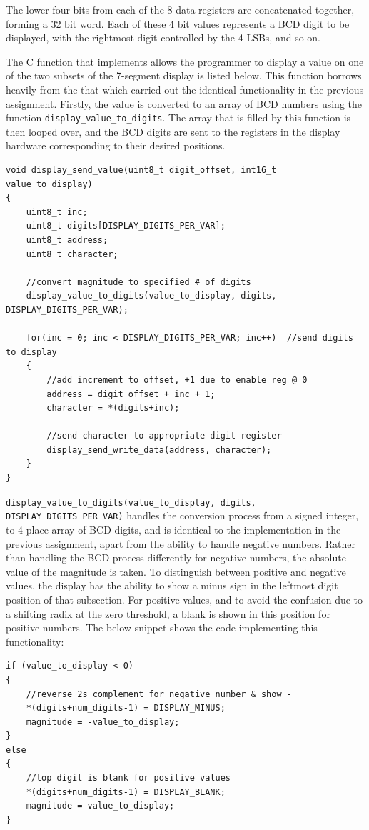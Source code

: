 \documentclass[11pt,british]{report}
\begin{document}
The lower four bits from each of the 8 data registers are concatenated together, forming a 32 bit word. Each of these 4 bit values represents a BCD digit to be displayed, with the rightmost digit controlled by the 4 LSBs, and so on.

The C function that implements allows the programmer to display a value on one of the two subsets of the 7-segment display is listed below. This function borrows heavily from the that which carried out the identical functionality in the previous assignment. Firstly, the value is converted to an array of BCD numbers using the function \lstinline[style={c-style}]|display_value_to_digits|. The array that is filled by this function is then looped over, and the BCD digits are sent to the registers in the display hardware corresponding to their desired positions.
\begin{lstlisting}[style={c-style}]
void display_send_value(uint8_t digit_offset, int16_t value_to_display)
{
	uint8_t inc;
	uint8_t digits[DISPLAY_DIGITS_PER_VAR];
	uint8_t address;
	uint8_t character;
	
	//convert magnitude to specified # of digits
	display_value_to_digits(value_to_display, digits, DISPLAY_DIGITS_PER_VAR); 
	
	for(inc = 0; inc < DISPLAY_DIGITS_PER_VAR; inc++)  //send digits to display
	{   
	    //add increment to offset, +1 due to enable reg @ 0    
		address = digit_offset + inc + 1;
		character = *(digits+inc);
		
		//send character to appropriate digit register
		display_send_write_data(address, character);
	}
}
\end{lstlisting}

\lstinline[style={c-style}]|display_value_to_digits(value_to_display, digits, DISPLAY_DIGITS_PER_VAR)| handles the conversion process from a signed integer, to 4 place array of BCD digits, and is identical to the implementation in the previous assignment, apart from the ability to handle negative numbers. Rather than handling the BCD process differently for negative numbers, the absolute value of the magnitude is taken. To distinguish between positive and negative values, the display has the ability to show a minus sign in the leftmost digit position of that subsection. For positive values, and to avoid the confusion due to a shifting radix at the zero threshold, a blank is shown in this position for positive numbers. The below snippet shows the code implementing this functionality:
\begin{lstlisting}[style={c-style}]
if (value_to_display < 0) 
{
    //reverse 2s complement for negative number & show -
	*(digits+num_digits-1) = DISPLAY_MINUS;
	magnitude = -value_to_display; 
}
else
{
	//top digit is blank for positive values
	*(digits+num_digits-1) = DISPLAY_BLANK; 
	magnitude = value_to_display;
}
\end{lstlisting}
\end{document}

